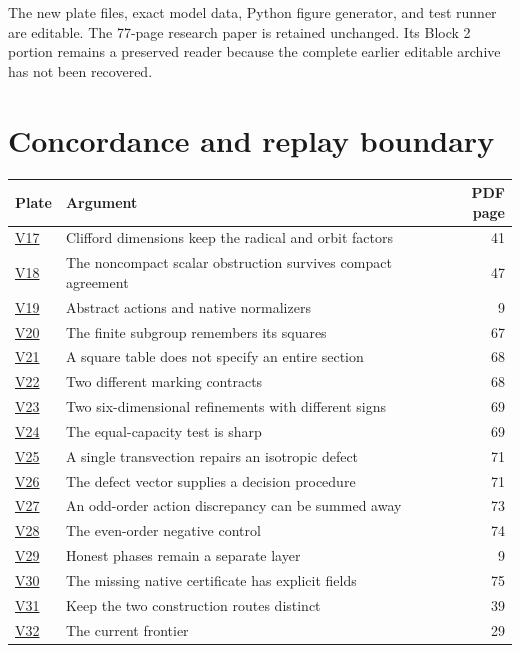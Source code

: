 \documentclass[11pt]{article}
\begin{document}
The new plate files, exact model data, Python figure generator, and test runner are editable. The 77-page research paper is retained unchanged. Its Block 2 portion remains a preserved reader because the complete earlier editable archive has not been recovered.

\clearpage{}
\section*{Concordance and replay boundary}
\begin{center}\small\renewcommand{\arraystretch}{1.22}
\begin{tabular}{@{}p{.08\linewidth}p{.67\linewidth}r@{}}\toprule
Plate & Argument & PDF page\\\midrule
\hyperref[plate:V17]{V17} & Clifford dimensions keep the radical and orbit factors & 41 \\
\hyperref[plate:V18]{V18} & The noncompact scalar obstruction survives compact agreement & 47 \\
\hyperref[plate:V19]{V19} & Abstract actions and native normalizers & 9 \\
\hyperref[plate:V20]{V20} & The finite subgroup remembers its squares & 67 \\
\hyperref[plate:V21]{V21} & A square table does not specify an entire section & 68 \\
\hyperref[plate:V22]{V22} & Two different marking contracts & 68 \\
\hyperref[plate:V23]{V23} & Two six-dimensional refinements with different signs & 69 \\
\hyperref[plate:V24]{V24} & The equal-capacity test is sharp & 69 \\
\hyperref[plate:V25]{V25} & A single transvection repairs an isotropic defect & 71 \\
\hyperref[plate:V26]{V26} & The defect vector supplies a decision procedure & 71 \\
\hyperref[plate:V27]{V27} & An odd-order action discrepancy can be summed away & 73 \\
\hyperref[plate:V28]{V28} & The even-order negative control & 74 \\
\hyperref[plate:V29]{V29} & Honest phases remain a separate layer & 9 \\
\hyperref[plate:V30]{V30} & The missing native certificate has explicit fields & 75 \\
\hyperref[plate:V31]{V31} & Keep the two construction routes distinct & 39 \\
\hyperref[plate:V32]{V32} & The current frontier & 29 \\
\bottomrule\end{tabular}\end{center}
\end{document}
